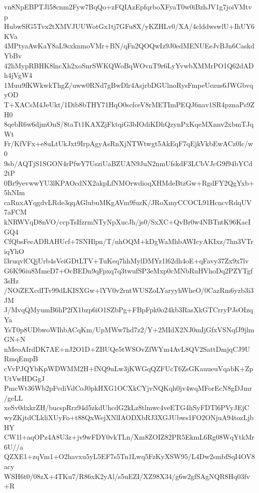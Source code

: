 vn8NpEBPTJl58cnm2Fyw7BqQo+zFQIAzEpfqrboXFyaT0w0iBzhJV1g7joiVMtvp
HubwSfG5Tvx2tXMVJUUWotGx1tj7GFu8X/yKZHLv0/XA/4clddwswlU+IhUY6KVa
4MPtyaAwKaY8aL9sxknmoVMr+BN/qFn2QOQwIz9J0edMENUEeJvBJn6CaskdYbBv
42hMypRBHK8lncXh2xoSnrSWKQWoBqWOvnT9r6LyYvwbXMMrPO1Q62dADh4jVgW4
1Muu9fKWkwkThgZ/uww0RNd7gBwDlr4AsjrbDGUlnoRysFmpeUezus6JWGbvqyOD
T+XACsM4JeUkt/1Dib8bTHY71HqO0scfceV8rMETImPEQJ6nav1SR4pznaPs9ZH0
8qebR6w6djmOnS/8taTt1KAXZjFktqiG3bIOdiKDhQzynPxKqeMXnnv2xbmTJqWt
Fr/KfVFx+e8uLtUkJxt9IrpAgyAsRnXjNTWtwgt5AkEqF7qEjkVkbEwACz0lc/w0
9sb/AQTjS1SGON4rPfwY7UsziUaBZUAN9JuN2nmUfskdF3LCbVJcG9f94bYCd2tP
0Br9yevwwYU3lKPAOcdNX2akpLfNMOrwdioqXHMdeBtzGw+RgdFY2QgYxb+5hNIm
caRnxAYqgdvLRde3qqAGlubuMKgAVm9fuzK/JRoXmyCCOCL91HcncvRdqUV7aFCM
kNRWVqD8nVO/ccpTsIfzrmNTyNpXucJh/js0/SxXC+QvBr0w4NBTntK96KacIGQ4
CfQbsFeeADRAHUcf+7SNHlpn/T/nhOQM+kDgWaMhbAWIcyAKIxz/7hn3VTriqYhO
l3ruqvlCQjUrb4sVeiGDtLTV+TuKeq7hhMylDMYz1l62dh4oE+qFavy37Zx9x7lv
G6K96iu8MmeD7+OcBEDn9qFpxq7q3twufSP3eMxp0cMNbRuHVhoDq2PZYTgf3sHz
/NOiZEXcdITv99dLKISXGw+lYV0v2rntWUSZoLYaryyhWheO/0CazRm6yzb3i3JM
J/MvqQMyumB6hP2fX1bzp6iO1SZbPg+FBpFpk0o24kb3RasXkGTCrryPJsOIzqYa
YsT0p8UDbwoWIhbACqKm/UpMWw7hd7z2/Y+2MIdX2NJ0mIjGfxVSNqfJ9jlmGN+N
nMeoAIrdDK7AE+nJ2O1D+ZBUQe5tWSOvZfWYm4AvL8QV2SattDmjqCJ9URmqEmpB
cVvPJQYbKpWDWMM2H+fNQ9uLw3jKWGqQZFUcT6ZsGKauueuVqabK+ZpUtVwHDGgJ
PmcWt36Wb2pFvdiVdCoJ0pkHXG1OCXkCYjvNQKqh0jv4wqMForEcN8gDJmr/geLL
xeSv0dxkrZH/bucspRrz94d5zkdUhcdG2kLz8tlmwc4veETG4hSyFDTl6PVyJEjC
wyZKjtdCLkliXUyFo+t88QxWejXNlIAODXbRJ3XGJUbws1FO2ONjuA94tozLjbHY
CW1l+aqOPz4A8U3z+jv9wFDY0vkTLn/Xm8ZOIZ82PR5EkmL6Rg08WqYtkMr6U//a
QZXE1+zqVm1+O2havxu5yL5EF7s5Tn1Lwq5FzKyXSW95/L4Dw2smbfSqI4OV8acy
WSH6t0/08zX+4TKu7/R86xK2yAl/s5uEZI/XZ98X34/g6w2gfSAgNQR8Hq03fv+R
